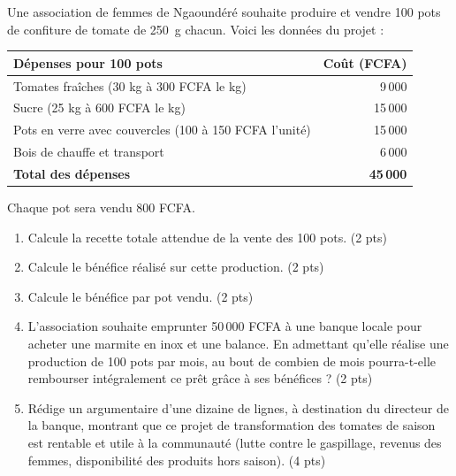 \documentclass[11pt]{article}
\begin{document}
\begin{exercice}
Une association de femmes de Ngaoundéré souhaite produire et vendre 100 pots de confiture de tomate de \SI{250}{g} chacun. Voici les données du projet :
\begin{center}
\begin{tabularx}{\linewidth}{|X|r|}
\hline
\rowcolor{popblueL} \textbf{Dépenses pour 100 pots} & \textbf{Coût (FCFA)} \\
\hline
Tomates fraîches (30 kg à 300 FCFA le kg) & 9\,000 \\
\hline
Sucre (25 kg à 600 FCFA le kg) & 15\,000 \\
\hline
Pots en verre avec couvercles (100 à 150 FCFA l'unité) & 15\,000 \\
\hline
Bois de chauffe et transport & 6\,000 \\
\hline
\rowcolor{popgoldL} \textbf{Total des dépenses} & \textbf{45\,000} \\
\hline
\end{tabularx}
\end{center}
Chaque pot sera vendu 800 FCFA.
\begin{enumerate}
\item Calcule la recette totale attendue de la vente des 100 pots. (2 pts)
\item Calcule le bénéfice réalisé sur cette production. (2 pts)
\item Calcule le bénéfice par pot vendu. (2 pts)
\item L'association souhaite emprunter 50\,000 FCFA à une banque locale pour acheter une marmite en inox et une balance. En admettant qu'elle réalise une production de 100 pots par mois, au bout de combien de mois pourra-t-elle rembourser intégralement ce prêt grâce à ses bénéfices ? (2 pts)
\item Rédige un argumentaire d'une dizaine de lignes, à destination du directeur de la banque, montrant que ce projet de transformation des tomates de saison est rentable et utile à la communauté (lutte contre le gaspillage, revenus des femmes, disponibilité des produits hors saison). (4 pts)
\end{enumerate}
\end{exercice}
\end{document}
